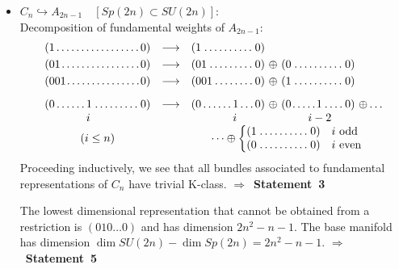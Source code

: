 \documentclass[12pt,a4paper]{article}
\newcommand{\embin}{{\hookrightarrow}}
\begin{document}
\begin{appendix}
\begin{itemize}
\item $C_{n}\embin A_{2n-1}\quad [Sp (2n)\subset SU (2n)]$:\\
Decomposition of fundamental weights of $A_{2n-1}$:
\[
\setlength{\arraycolsep}{0mm}
\begin{array}{p{13mm}p{20mm}cp{13mm}p{10mm}cp{11mm}p{12mm}c}
\multicolumn{2}{l}{$(1\dotfill 0)$}&\ \ \ \longrightarrow\ \ \ 
&\multicolumn{2}{l}{$(1\dotfill 0)$}\\[1mm]
\multicolumn{2}{l}{$(01\dotfill 0)$}&\longrightarrow 
&\multicolumn{2}{l}{$(01\dotfill 0)$}&\ \oplus\ 
&\multicolumn{2}{l}{$(0\dotfill 0)$}\\[1mm]
\multicolumn{2}{l}{$(001\dotfill 0)$}&\longrightarrow 
&\multicolumn{2}{l}{$(001\dotfill 0)$}&\oplus 
&\multicolumn{2}{l}{$(1\dotfill 0)$}\\[3mm]
$(0\dotfill $&$1\dotfill 0)$&\longrightarrow 
&$(0\dotfill$&$1\dotfill 0)$&\oplus 
&$(0\dotfill$&$1\dotfill 0)$&\ \oplus \dots \\
 &$i$& & &$i$& & &\makebox[2mm]{$i-2$}& \\
\multicolumn{2}{c}{(i\leq n)} & 
&\multicolumn{6}{c}{\dots \oplus 
\left\{\begin{array}{ll}\makebox[23mm]{$(1\dotfill 0)$}&
\ \ \ i\text{ odd}\\
\makebox[23mm]{$(0\dotfill 0)$}&\ \ \ i\text{ even}
\end{array} \right. 
}
\end{array}
\]
Proceeding inductively, we see that all bundles associated to
fundamental representations of $C_{n}$ have trivial
K-class. $\Rightarrow $~{\bf Statement~3}

The lowest dimensional representation that cannot be 
obtained from a restriction
is $(010 \dots 0)$ and has dimension $2n^{2}-n-1$. The base manifold
has dimension $\dim SU (2n)-\dim Sp (2n)=2n^{2}-n-1$. 
$\Rightarrow $~{\bf Statement~5}


\end{itemize}
\end{appendix}
\end{document}
